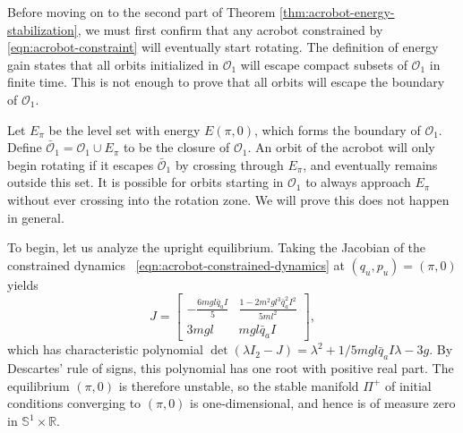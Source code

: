 \documentclass[journal,twoside,web]{ieeecolor}
\newcommand*{\R}{\mathbb{R}}
\newcommand*{\Sone}{\mathbb{S}^1}
\newcommand*{\SxR}{\Sone \times \R}
\newcommand*{\Id}[1]{I_{#1}}
\begin{document}
{Before moving on to the second part of Theorem
\ref{thm:acrobot-energy-stabilization}, we must first confirm that any acrobot
constrained by \eqref{eqn:acrobot-constraint} will eventually start rotating.
The definition of energy gain states that all orbits initialized in
\(\mathcal{O}_1\) will escape compact subsets of \(\mathcal{O}_1\) in finite time. 
This is not enough to prove that all orbits will escape the boundary of
\(\mathcal{O}_1\). 

Let \(E_\pi\) be the level set with energy \(E(\pi,0)\), 
which forms the boundary of \(\mathcal{O}_1\). 
Define \(\bar{\mathcal{O}}_1 = \mathcal{O}_1 \cup E_\pi\) to be the closure of
\(\mathcal{O}_1\).
An orbit of the acrobot will only begin rotating if it escapes
\(\bar{\mathcal{O}}_1\) by crossing through \(E_\pi\), and eventually remains
outside this set.
It is possible for orbits starting in \(\mathcal{O}_1\) to always approach
\(E_\pi\) without ever crossing into the rotation zone.
We will prove this does not happen in general.

To begin, let us analyze the upright equilibrium.
Taking the Jacobian of the constrained dynamics
~\eqref{eqn:acrobot-constrained-dynamics} at \((q_u,p_u) = (\pi,0)\) yields
\[
    J = \begin{bmatrix}
        -\frac{6mgl\bar{q}_aI}{5} & \frac{1 - 2m^2gl^3\bar{q}_a^2 I^2}{5ml^2} \\
        3mgl & mgl\bar{q}_aI
    \end{bmatrix}
    ,
\]
which has characteristic polynomial
\(\det\left(\lambda \Id{2} - J\right)
= \lambda^2 + 1/5 mgl\bar{q}_a I \lambda - 3g\).
By Descartes' rule of signs, this polynomial has one root with positive real
part. 
The equilibrium \((\pi,0)\) is therefore unstable, so the stable manifold \(\Pi^+\) of
initial conditions converging to \((\pi,0)\) is one-dimensional, and hence is
of measure zero in \(\SxR\).

}
\end{document}
